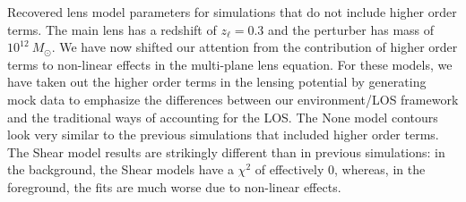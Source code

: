 \label{fig:frontback} Recovered lens model parameters for simulations that do not include higher order terms. The main lens has a redshift of $z_\ell = 0.3$ and the perturber has mass of $10^{12}~ M_\odot$. We have now shifted our attention from the contribution of higher order terms to non-linear effects in the multi-plane lens equation. For these models, we have taken out the higher order terms in the lensing potential by generating mock data to emphasize the differences between our environment/LOS framework and the traditional ways of accounting for the LOS. The None model contours look very similar to the previous simulations that included higher order terms. The Shear model results are strikingly different than in previous simulations: in the background, the Shear models have a $\chi^2$ of effectively 0, whereas, in the foreground, the fits are much worse due to non-linear effects.